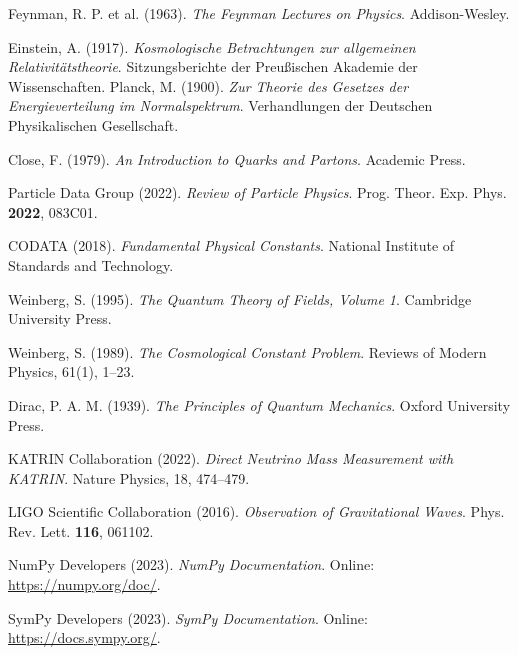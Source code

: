 \documentclass[12pt,a4paper]{article}
\begin{document}
\begin{thebibliography}{20}
		Feynman, R. P. et al. (1963). 
		\textit{The Feynman Lectures on Physics}. 
		Addison-Wesley.
		
		Einstein, A. (1917). 
		\textit{Kosmologische Betrachtungen zur allgemeinen Relativitätstheorie}. 
		Sitzungsberichte der Preußischen Akademie der Wissenschaften.
Planck, M. (1900). 
\textit{Zur Theorie des Gesetzes der Energieverteilung im Normalspektrum}. 
Verhandlungen der Deutschen Physikalischen Gesellschaft.

Close, F. (1979). 
\textit{An Introduction to Quarks and Partons}. 
Academic Press.

Particle Data Group (2022). 
\textit{Review of Particle Physics}. 
Prog. Theor. Exp. Phys. \textbf{2022}, 083C01.

CODATA (2018). 
\textit{Fundamental Physical Constants}. 
National Institute of Standards and Technology.

Weinberg, S. (1995). 
\textit{The Quantum Theory of Fields, Volume 1}. 
Cambridge University Press.

Weinberg, S. (1989). 
\textit{The Cosmological Constant Problem}. 
Reviews of Modern Physics, 61(1), 1--23.

Dirac, P. A. M. (1939). 
\textit{The Principles of Quantum Mechanics}. 
Oxford University Press.

KATRIN Collaboration (2022). 
\textit{Direct Neutrino Mass Measurement with KATRIN}. 
Nature Physics, 18, 474--479.

LIGO Scientific Collaboration (2016). 
\textit{Observation of Gravitational Waves}. 
Phys. Rev. Lett. \textbf{116}, 061102.

NumPy Developers (2023). 
\textit{NumPy Documentation}. 
Online: \url{https://numpy.org/doc/}.

SymPy Developers (2023). 
\textit{SymPy Documentation}. 
Online: \url{https://docs.sympy.org/}.

\end{thebibliography}
\end{document}
